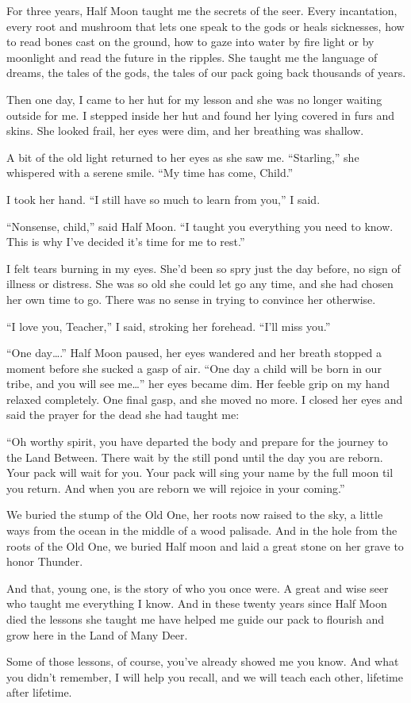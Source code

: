 For three years, Half Moon taught me the secrets of the seer. Every incantation, every root and mushroom that lets one speak to the gods or heals sicknesses, how to read bones cast on the ground, how to gaze into water by fire light or by moonlight and read the future in the ripples. She taught me the language of dreams, the tales of the gods, the tales of our pack going back thousands of years.

Then one day, I came to her hut for my lesson and she was no longer waiting outside for me. I stepped inside her hut and found her lying covered in furs and skins. She looked frail, her eyes were dim, and her breathing was shallow.

A bit of the old light returned to her eyes as she saw me. ``Starling,'' she whispered with a serene smile. ``My time has come, Child.''

I took her hand. ``I still have so much to learn from you,'' I said.

``Nonsense, child,'' said Half Moon. ``I taught you everything you need to know. This is why I've decided it's time for me to rest.''

I felt tears burning in my eyes. She'd been so spry just the day before, no sign of illness or distress. She was so old she could let go any time, and she had chosen her own time to go. There was no sense in trying to convince her otherwise.

``I love you, Teacher,'' I said, stroking her forehead. ``I'll miss you.''

``One day\ldots.'' Half Moon paused, her eyes wandered and her breath stopped a moment before she sucked a gasp of air. ``One day a child will be born in our tribe, and you will see me\ldots'' her eyes became dim. Her feeble grip on my hand relaxed completely. One final gasp, and she moved no more. I closed her eyes and said the prayer for the dead she had taught me:

``Oh worthy spirit, you have departed the body and prepare for the journey to the Land Between. There wait by the still pond until the day you are reborn. Your pack will wait for you. Your pack will sing your name by the full moon til you return. And when you are reborn we will rejoice in your coming.''

We buried the stump of the Old One, her roots now raised to the sky, a little ways from the ocean in the middle of a wood palisade. And in the hole from the roots of the Old One, we buried Half moon and laid a great stone on her grave to honor Thunder.

And that, young one, is the story of who you once were. A great and wise seer who taught me everything I know. And in these twenty years since Half Moon died the lessons she taught me have helped me guide our pack to flourish and grow here in the Land of Many Deer.

Some of those lessons, of course, you've already showed me you know. And what you didn't remember, I will help you recall, and we will teach each other, lifetime after lifetime.
